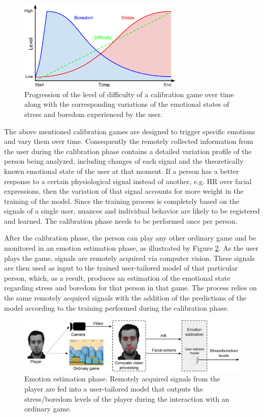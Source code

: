 \begin{figure}[h!]
    \centering
    \includegraphics[width=0.7\textwidth]{Content/figures/calibration-game-linear}
    \caption{Progression of the level of difficulty of a calibration game over time along with the corresponding variations of the emotional states of stress and boredom experienced by the user.}
    \label{fig:calibration-game-linear}
\end{figure}

The above mentioned calibration games are designed to trigger specific emotions and vary them over time. Consequently the remotely collected information from the user during the calibration phase contains a detailed variation profile of the person being analyzed, including changes of each signal and the theoretically known emotional state of the user at that moment. If a person has a better response to a certain physiological signal instead of another, e.g. HR over facial expressions, then the variation of that signal accounts for more weight in the training of the model. Since the training process is completely based on the signals of a single user, nuances and individual behavior are likely to be registered and learned. The calibration phase needs to be performed once per person.

After the calibration phase, the person can play any other ordinary game and be monitored in an emotion estimation phase, as illustrated by Figure \ref{fig:user-tailored-use}. As the user plays the game, signals are remotely acquired via computer vision. These signals are then used as input to the trained user-tailored model of that particular person, which, as a result, produces an estimation of the emotional state regarding stress and boredom for that person in that game. The process relies on the same remotely acquired signals with the addition of the predictions of the model according to the training performed during the calibration phase.

\begin{figure}[h]
    \centering
    \includegraphics[width=\textwidth]{Content/figures/user-tailored-use}
    \caption{Emotion estimation phase. Remotely acquired signals from the player are fed into a user-tailored model that outputs the stress/boredom levels of the player during the interaction with an ordinary game.}
    \label{fig:user-tailored-use}
\end{figure}

